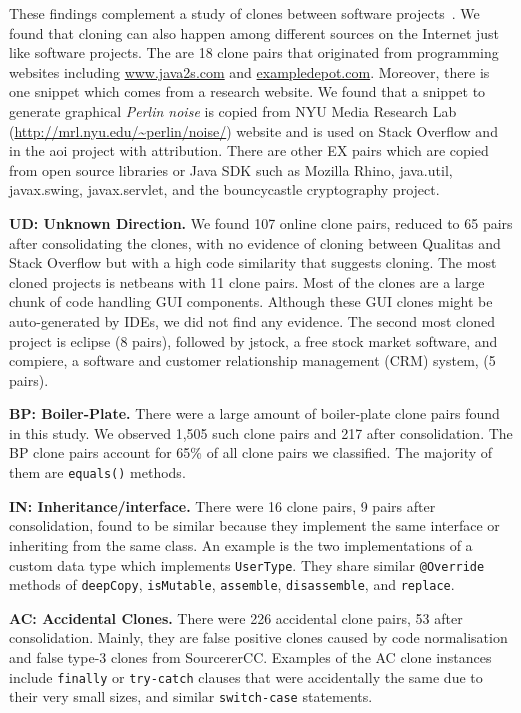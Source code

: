 \documentclass[10pt,journal,compsoc]{IEEEtran}
\begin{document}
These findings complement a study of clones between software
projects~\cite{Svajlenko2014}. We found that cloning can also happen among
different sources on the Internet just like software projects. The are 18 clone
pairs that originated from programming websites including \url{www.java2s.com}
and \url{exampledepot.com}. Moreover, there is one snippet which comes from a
research website. We found that a snippet to generate graphical \textit{Perlin
	noise} is copied from NYU Media Research Lab
(\url{http://mrl.nyu.edu/~perlin/noise/}) website and is used on Stack Overflow
and in the \textsf{aoi} project with attribution. There are other EX pairs which
are copied from open source libraries or Java SDK such as \textsf{Mozilla
	Rhino}, \textsf{java.util}, \textsf{javax.swing}, \textsf{javax.servlet}, and
the \textsf{bouncycastle} cryptography project.

\textbf{UD: Unknown Direction.} We found 107 online clone pairs, reduced to 65
pairs after consolidating the clones, with no evidence of cloning between Qualitas
and Stack Overflow but with a high code similarity that suggests cloning. 
The most cloned projects is \textsf{netbeans} with 11 clone pairs. Most of the
clones are a large chunk of code handling GUI components. Although these GUI
clones might be auto-generated by IDEs, we did not find any evidence. The second
most cloned project is \textsf{eclipse} (8 pairs), followed by \textsf{jstock},
a free stock market software, and \textsf{compiere}, a software and customer
relationship management (CRM) system, (5 pairs).

\textbf{BP: Boiler-Plate.} There were a large amount of boiler-plate clone pairs
found in this study. We observed 1,505 such clone pairs and 217 after
consolidation. The BP clone pairs account for 65\% of all clone pairs we
classified. The majority of them are {\small{\texttt{equals()}}} methods.

\textbf{IN: Inheritance/interface.} There were 16 clone pairs, 9 pairs after
consolidation, found to be similar because they implement the same interface or
inheriting from the same class. An example is the two implementations of a
custom data type which implements {\small\texttt{UserType}}. They share similar
{\small\texttt{@Override}} methods of {\small\texttt{deepCopy}},
{\small\texttt{isMutable}}, {\small\texttt{assemble}},
{\small\texttt{disassemble}}, and {\small\texttt{replace}}.

\textbf{AC: Accidental Clones.} There were 226 accidental clone
pairs, 53 after consolidation. Mainly, they are false positive clones caused by code
normalisation and false type-3 clones from SourcererCC. 
Examples of the AC clone instances include {\small\texttt{finally}} or
{\small\texttt{try-catch}} clauses that were accidentally the same due
to their very small sizes, and similar {\small\texttt{switch-case}}
statements.
\end{document}
